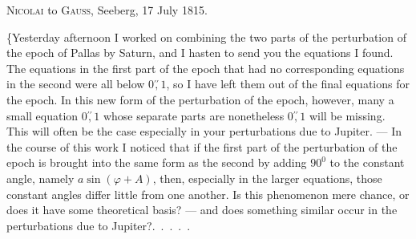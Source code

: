 \par\medskip
{}
\begin{center}
\textsc{Nicolai} to \textsc{Gauss}, Seeberg, 17 July 1815.
\end{center}
\par\noindent\hspace*{\parindent}\{Yesterday afternoon I worked on combining the two
parts of the perturbation of the epoch of Pallas by Saturn, and I
hasten to send you the equations I found. The equations
in the first part of the epoch that had no corresponding equations in the second
were all below \(0\overset{\prime\prime}{,}1\), so I have left them out of the
final equations for the epoch. In this new form
of the perturbation of the epoch, however, many a small equation  \(0\overset{\prime\prime}{,}1\)
whose separate parts are nonetheless  \(0\overset{\prime\prime}{,}1\) will be missing. This will often be the case
especially in your perturbations due to Jupiter. --- In the course of this work
I noticed that if the first part of the perturbation of the epoch is brought
into the same form as the second by adding \(90^0\) to the constant angle,
namely \(a\sin(\varphi+A)\), then, especially in the larger equations,
those constant angles differ little from one another. Is this
phenomenon mere chance, or does it have some theoretical basis?
--- and does something similar occur in the perturbations due to Jupiter?\quad .\ .\ .\ .\ .

